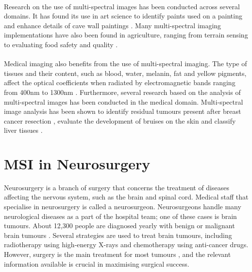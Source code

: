 \documentclass[12pt,oneside]{report}
\begin{document}
\paragraph{}
Research on the use of multi-spectral images has been conducted across several domains. It has found its use in art science to identify paints used on a painting \cite{pelagotti_multispectral_2008} and enhance details of cave wall paintings \cite{legnaioli_recovery_2013}. Many multi-spectral imaging implementations have also been found in agriculture, ranging from terrain sensing \cite{berni_thermal_2009} to evaluating food safety and quality \cite{qin_hyperspectral_2013}.

\paragraph{}
Medical imaging also benefits from the use of multi-spectral imaging. The type of tissues and their content, such as blood, water, melanin, fat and yellow pigments, affect the optical coefficients when radiated by electromagnetic bands ranging from 400nm to 1300nm \cite{jacques_optical_2013}. Furthermore, several research based on the analysis of multi-spectral images has been conducted in the medical domain. Multi-spectral image analysis has been shown to identify residual tumours present after breast cancer resection \cite{panasyuk_medical_2007}, evaluate the development of bruises on the skin \cite{randeberg_hyperspectral_2006} and classify liver tissues \cite{hashimoto_tissue_2017}.

\section{MSI in Neurosurgery}
\paragraph{}
Neurosurgery is a branch of surgery that concerns the treatment of diseases affecting the nervous system, such as the brain and spinal cord. Medical staff that specialise in neurosurgery is called a neurosurgeon. Neurosurgeons handle many neurological diseases as a part of the hospital team; one of these cases is brain tumours. About 12,300 people are diagnosed yearly with benign or malignant brain tumours \cite{cruk_brain_2023}. Several strategies are used to treat brain tumours, including radiotherapy using high-energy X-rays and chemotherapy using anti-cancer drugs. However, surgery is the main treatment for most tumours \cite{cruk_brain_2023, bush_current_2017}, and the relevant information available is crucial in maximising surgical success.
\end{document}
